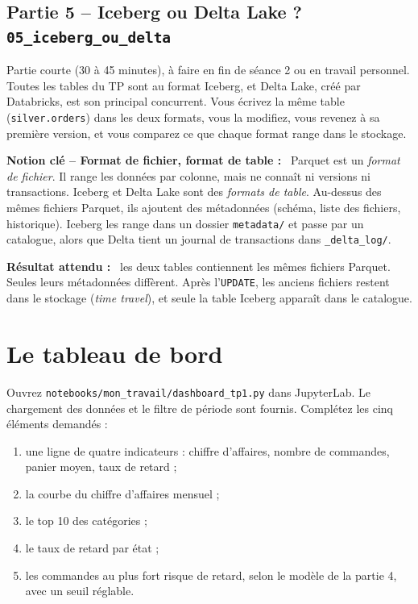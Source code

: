 \documentclass[11pt,a4paper]{article}
\newenvironment{resultat}{\par\medskip\noindent\textbf{Résultat attendu :}\ }{\par\medskip}
\newcommand{\cmd}[1]{\texttt{#1}}
\newenvironment{notion}[1][]{\par\medskip\noindent\textbf{\textcolor{lhblue}{Notion clé\if\relax\detokenize{#1}\relax\else{} -- #1\fi{} :}}\ }{\par\medskip}
\newcommand{\nb}[1]{\textcolor{lhblue}{\texttt{#1}}}
\begin{document}
\subsection*{Partie 5 -- Iceberg ou Delta Lake ? \hfill \nb{05\_iceberg\_ou\_delta}}

Partie courte (30 à 45 minutes), à faire en fin de séance 2 ou en travail personnel. Toutes les
tables du TP sont au format Iceberg, et Delta Lake, créé par Databricks, est son principal concurrent.
Vous écrivez la même table (\cmd{silver.orders}) dans les deux formats, vous la modifiez, vous
revenez à sa première version, et vous comparez ce que chaque format range dans le stockage.

\begin{notion}[Format de fichier, format de table]
Parquet est un \emph{format de fichier}. Il range les
données par colonne, mais ne connaît ni versions ni transactions. Iceberg et Delta Lake sont des
\emph{formats de table}. Au-dessus des mêmes fichiers Parquet, ils ajoutent des métadonnées (schéma,
liste des fichiers, historique). Iceberg les range dans un dossier \cmd{metadata/} et passe par un
catalogue, alors que Delta tient un journal de transactions dans \cmd{\_delta\_log/}.
\end{notion}

\begin{resultat}
les deux tables contiennent les mêmes fichiers Parquet. Seules leurs métadonnées diffèrent. Après
l'\cmd{UPDATE}, les anciens fichiers restent dans le stockage (\emph{time travel}), et seule la table
Iceberg apparaît dans le catalogue.
\end{resultat}


\section{Le tableau de bord}\label{sec:dashboard}

Ouvrez \nb{notebooks/mon\_travail/dashboard\_tp1.py} dans JupyterLab. Le chargement des données et le filtre de période
sont fournis. Complétez les cinq éléments demandés :

\begin{enumerate}[leftmargin=*,nosep]
  \item une ligne de quatre indicateurs : chiffre d'affaires, nombre de commandes, panier moyen, taux de retard ;
  \item la courbe du chiffre d'affaires mensuel ;
  \item le top 10 des catégories ;
  \item le taux de retard par état ;
  \item les commandes au plus fort risque de retard, selon le modèle de la partie 4, avec un seuil réglable.
\end{enumerate}
\end{document}
